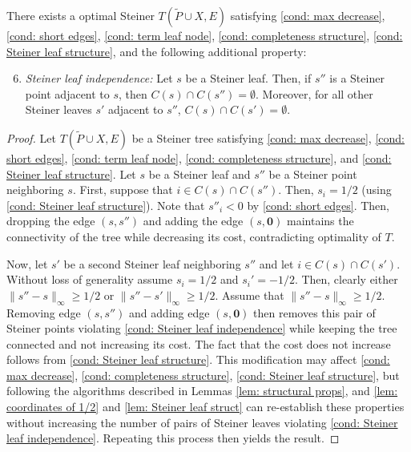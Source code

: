 \documentclass{article}\providecommand{\DeclareRedundantLanguages}[2]{}\usepackage[a4paper,margin=20mm]{geometry}
\newcommand{\1}{\textbf{1}}
\renewcommand{\tilde}{\widetilde}
\begin{document}
\begin{lemma} \label{lem: Steiner leaf independent neigbors}
There exists a optimal Steiner  $T(\tilde{P} \cup X, E)$ satisfying \ref{cond: max decrease}, \ref{cond: short edges}, \ref{cond: term leaf node}, \ref{cond: completeness structure}, \ref{cond: Steiner leaf structure}, and the following additional property:
\begin{enumerate}[label=(P\arabic*)]
\setcounter{enumi}{5}
    \item \textit{Steiner leaf independence:}
    Let $s$ be a Steiner leaf. Then, if $s''$ is a Steiner point adjacent to $s$, then $C(s) \cap C(s'') = \emptyset$. Moreover, for all other Steiner leaves $s'$ adjacent to $s''$, $C(s) \cap C(s') = \emptyset$. \label{cond: Steiner leaf independence}
\end{enumerate}
\end{lemma}
\begin{proof}
Let $T(\tilde{P} \cup X, E)$ be a Steiner tree satisfying \ref{cond: max decrease}, \ref{cond: short edges}, \ref{cond: term leaf node},  \ref{cond: completeness structure}, and \ref{cond: Steiner leaf structure}. Let $s$ be a Steiner leaf and $s''$ be a Steiner point neighboring $s$. First, suppose that $i \in C(s) \cap C(s'')$. Then, $s_i = 1/2$ (using \ref{cond: Steiner leaf structure}). Note that $s''_i < 0$ by \ref{cond: short edges}. Then, dropping the edge $(s, s'')$ and adding the edge $(s, \mathbf{0})$ maintains the connectivity of the tree while decreasing its cost, contradicting optimality of $T$.


Now, let $s'$ be a second Steiner leaf neighboring $s''$ and let $i \in C(s) \cap C(s')$. Without loss of generality assume $s_i = 1/2$ and $s_i' = -1/2$. Then, clearly either $\|s'' - s\|_{\infty} \geq 1/2$ or $\|s'' - s'\|_{\infty} \geq 1/2$. Assume that $\|s'' - s\|_{\infty} \geq 1/2$. Removing edge $(s, s'')$ and adding edge $(s, \mathbf{0})$ then removes this pair of Steiner points violating \ref{cond: Steiner leaf independence} while keeping the tree connected and not increasing its cost.  The fact that the cost does not increase follows from \ref{cond: Steiner leaf structure}. This modification may affect \ref{cond: max decrease}, \ref{cond: completeness structure}, \ref{cond: Steiner leaf structure}, but following the algorithms described in Lemmas \ref{lem: structural props}, and \ref{lem: coordinates of 1/2} and \ref{lem: Steiner leaf struct} can re-establish these properties without increasing the number of pairs of Steiner leaves violating \ref{cond: Steiner leaf independence}. Repeating this process then yields the result.
\end{proof}
\end{document}
